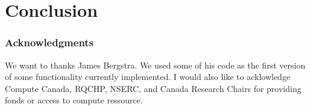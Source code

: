 \documentclass{article} %
\begin{document}
\section{Conclusion}

% 
% 


\subsubsection*{Acknowledgments}

We want to thanks James Bergstra. We used some of his code as the first version of some functionality currently implemented. I would also like to acklowledge Compute Canada, RQCHP, NSERC, and Canada Research Chairs for providing fonds or access to compute ressource.




\end{document}
